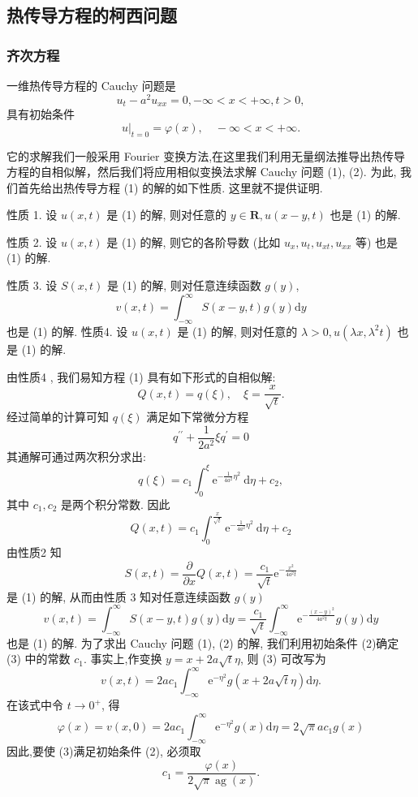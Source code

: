 \subsection{热传导方程的柯西问题}
\subsubsection{齐次方程}

一维热传导方程的 Cauchy 问题是
\begin{equation*}
    u_{t}-a^{2} u_{x x}=0,-\infty<x<+\infty, t>0,\tag{1}
\end{equation*}
具有初始条件
\begin{equation*}
   \left.u\right|_{t=0}=\varphi(x), \quad-\infty<x<+\infty . \tag{2}
\end{equation*}

它的求解我们一般采用 Fourier 变换方法,在这里我们利用无量纲法推导出热传导方程的自相似解，然后我们将应用相似变换法求解 Cauchy 问题 (1), (2). 为此, 我们首先给出热传导方程 (1) 的解的如下性质. 这里就不提供证明.

性质 1. 设 $ u(x, t) $ 是 (1) 的解, 则对任意的 $ y \in \mathbf{R}, u(x-y, t) $ 也是 (1) 的解.

性质 2. 设 $ u(x, t) $ 是 (1) 的解, 则它的各阶导数 (比如 $ u_{x}, u_{t}, u_{x t}, u_{x x} $ 等) 也是 (1) 的解.

性质 3. 设 $ S(x, t) $ 是  (1) 的解, 则对任意连续函数 $ g(y) $,
$$
v(x, t)=\int_{-\infty}^{\infty} S(x-y, t) g(y) \mathrm{d} y
$$
也是 (1) 的解.
性质4. 设 $ u(x, t) $ 是 (1) 的解, 则对任意的 $ \lambda>0, u\left(\lambda x, \lambda^{2} t\right) $ 也是 (1) 的解.

由性质4 , 我们易知方程 (1) 具有如下形式的自相似解:
$$
Q(x, t)=q(\xi), \quad \xi=\frac{x}{\sqrt{t}} .
$$
经过简单的计算可知 $ q(\xi) $ 满足如下常微分方程
$$
q^{\prime \prime}+\frac{1}{2 a^{2}} \xi q^{\prime}=0
$$
其通解可通过两次积分求出:
$$
q(\xi)=c_{1} \int_{0}^{\xi} \mathrm{e}^{-\frac{1}{4 a^{2}} \eta^{2}} \mathrm{~d} \eta+c_{2},
$$
其中 $ c_{1}, c_{2} $ 是两个积分常数.
因此
$$
Q(x, t)=c_{1} \int_{0}^{\frac{x}{\sqrt{t}}} \mathrm{e}^{-\frac{1}{4 a^{2}} \eta^{2}} \mathrm{~d} \eta+c_{2}
$$
由性质2 知
$$
S(x, t)=\frac{\partial}{\partial x} Q(x, t)=\frac{c_{1}}{\sqrt{t}} \mathrm{e}^{-\frac{x^{2}}{4 a^{2} t}}
$$
是 (1) 的解, 从而由性质 3 知对任意连续函数 $ g(y) $
\begin{equation*}
    v(x, t)=\int_{-\infty}^{\infty} S(x-y, t) g(y) \mathrm{d} y=\frac{c_{1}}{\sqrt{t}} \int_{-\infty}^{\infty} \mathrm{e}^{-\frac{(x-y)^{2}}{4 a^{2} t}} g(y) \mathrm{d} y\tag{3}
\end{equation*}
也是 (1) 的解. 为了求出 Cauchy 问题 (1), (2) 的解, 我们利用初始条件 (2)确定 (3) 中的常数 $ c_{1} $.
事实上,作变换 $ y=x+2 a \sqrt{t} \eta $, 则 (3) 可改写为
$$
v(x, t)=2 a c_{1} \int_{-\infty}^{\infty} \mathrm{e}^{-\eta^{2}} g(x+2 a \sqrt{t} \eta) \mathrm{d} \eta .
$$
在该式中令 $ t \rightarrow 0^{+} $, 得
$$
\varphi(x)=v(x, 0)=2 a c_{1} \int_{-\infty}^{\infty} \mathrm{e}^{-\eta^{2}} g(x) \mathrm{d} \eta=2 \sqrt{\pi} a c_{1} g(x)
$$
因此,要使 (3)满足初始条件 (2), 必须取
$$
c_{1}=\frac{\varphi(x)}{2 \sqrt{\pi} \operatorname{ag}(x)} .
$$

